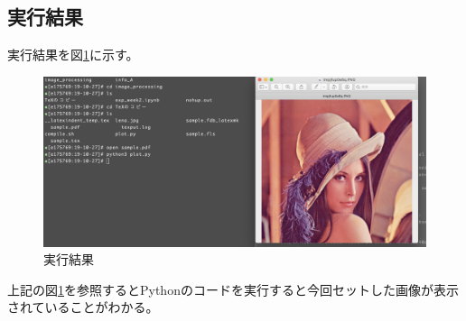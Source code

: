 \documentclass[a4paper,11pt,titlepage]{jarticle}
\begin{document}
\subsection{実行結果}
実行結果を図\ref{ex1}に示す。
\begin{figure}[H]
	\centering
	\includegraphics[width=120mm]{ex1.png}
	\caption{実行結果}
	\label{ex1}
\end{figure}
上記の図\ref{ex1}を参照するとPythonのコードを実行すると今回セットした画像が表示されていることがわかる。
%

\end{document}

